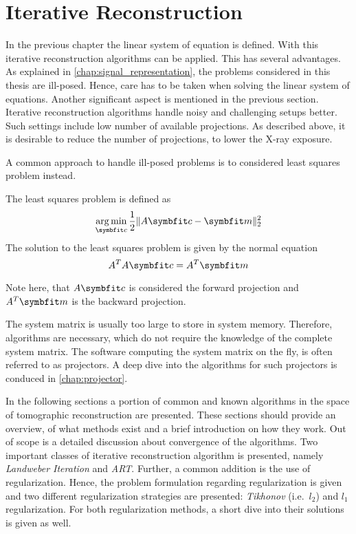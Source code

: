 \section{Iterative Reconstruction}\label{sec:iterative_reconstruction}

In the previous chapter the linear system of equation is defined. With this iterative reconstruction
algorithms can be applied. This has several advantages. As explained in
\autoref{chap:signal_representation}, the problems considered in this thesis are ill-posed. Hence,
care has to be taken when solving the linear system of equations. Another significant aspect is
mentioned in the previous section. Iterative reconstruction algorithms handle noisy and challenging
setups better. Such settings include low number of available projections. As described above, it is
desirable to reduce the number of projections, to lower the X-ray exposure.

A common approach to handle ill-posed problems is to considered least squares problem instead.
\begin{definition}\label{def:least_squares_problem}
	The least squares problem is defined as
	\[ \argmin_{\mvec{c}} \frac{1}{2} \norm{A\mvec{c} - \mvec{m}}^2_2 \]
	The solution to the least squares problem is given by the normal equation
	\[ A^T A \mvec{c} = A^T \mvec{m} \]
\end{definition}
Note here, that \(A\mvec{c}\) is considered the forward projection and \(A^T \mvec{m}\) is the
backward projection.

The system matrix is usually too large to store in system memory. Therefore, algorithms are
necessary, which do not require the knowledge of the complete system matrix. The software computing
the system matrix on the fly, is often referred to as projectors. A deep dive into the algorithms
for such projectors is conduced in \autoref{chap:projector}.

In the following sections a portion of common and known algorithms in the space of tomographic
reconstruction are presented. These sections should provide an overview, of what methods exist and
a brief introduction on how they work. Out of scope is a detailed discussion about convergence of
the algorithms. Two important classes of iterative reconstruction algorithm is presented, namely
\textit{Landweber Iteration} and \textit{\gls{ART}}. Further, a common addition is the use of regularization.
Hence, the problem formulation regarding regularization is given and two different regularization
strategies are presented: \textit{Tikhonov} (i.e.\ \(l_2\)) and \(l_1\) regularization. For both
regularization methods, a short dive into their solutions is given as well.

